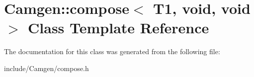 \hypertarget{a00097}{\section{Camgen\-:\-:compose$<$ T1, void, void $>$ Class Template Reference}
\label{a00097}
}


The documentation for this class was generated from the following file\-:\begin{DoxyCompactItemize}
\item 
include/\-Camgen/compose.\-h\end{DoxyCompactItemize}
